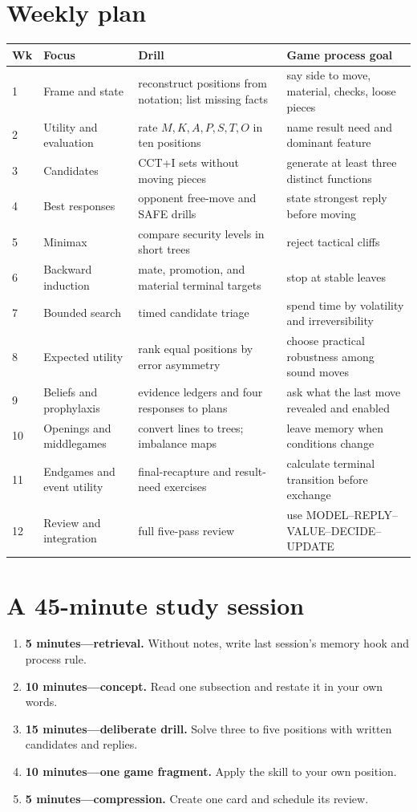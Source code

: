 \section{Weekly plan}
\begin{longtable}{@{}p{}p{}p{}p{}@{}}
\toprule
\textbf{Wk} & \textbf{Focus} & \textbf{Drill} & \textbf{Game process goal}\\
\midrule
1 & Frame and state & reconstruct positions from notation; list missing facts & say side to move, material, checks, loose pieces\\
2 & Utility and evaluation & rate $M,K,A,P,S,T,O$ in ten positions & name result need and dominant feature\\
3 & Candidates & CCT+I sets without moving pieces & generate at least three distinct functions\\
4 & Best responses & opponent free-move and SAFE drills & state strongest reply before moving\\
5 & Minimax & compare security levels in short trees & reject tactical cliffs\\
6 & Backward induction & mate, promotion, and material terminal targets & stop at stable leaves\\
7 & Bounded search & timed candidate triage & spend time by volatility and irreversibility\\
8 & Expected utility & rank equal positions by error asymmetry & choose practical robustness among sound moves\\
9 & Beliefs and prophylaxis & evidence ledgers and four responses to plans & ask what the last move revealed and enabled\\
10 & Openings and middlegames & convert lines to trees; imbalance maps & leave memory when conditions change\\
11 & Endgames and event utility & final-recapture and result-need exercises & calculate terminal transition before exchange\\
12 & Review and integration & full five-pass review & use MODEL--REPLY--VALUE--DECIDE--UPDATE\\
\bottomrule
\end{longtable}

\section{A 45-minute study session}
\begin{enumerate}[label=\textbf{\arabic*.},leftmargin=2em]
\item \textbf{5 minutes---retrieval.} Without notes, write last session's memory hook and process rule.
\item \textbf{10 minutes---concept.} Read one subsection and restate it in your own words.
\item \textbf{15 minutes---deliberate drill.} Solve three to five positions with written candidates and replies.
\item \textbf{10 minutes---one game fragment.} Apply the skill to your own position.
\item \textbf{5 minutes---compression.} Create one card and schedule its review.
\end{enumerate}

